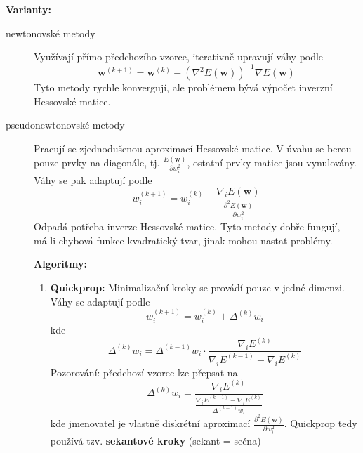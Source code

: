 \documentclass[11pt]{report} %
\renewcommand{\vec}[1]{\mathbf{#1}}
\numberwithin{equation}{section}
\begin{document}
\textbf{Varianty:}
\begin{description}
	
	
	\item[newtonovské metody] Využívají přímo předchozího vzorce, iterativně upravují váhy podle
	$$
	\vec{w}^{(k+1)} = \vec{w}^{(k)} - (\nabla^2 E(\vec{w}))^{-1} \nabla E(\vec{w})
	$$
	Tyto metody rychle konvergují, ale problémem bývá výpočet inverzní Hessovské matice.
	
	\item[pseudonewtonovské metody] Pracují se zjednodušenou aproximací Hessovské matice. V úvahu se berou pouze prvky na diagonále, tj. $\frac{E(\vec{w})}{\partial w_i^2}$, ostatní prvky matice jsou vynulovány. Váhy se pak adaptují podle
	$$
	w_i^{(k+1)} = w_i^{(k)} - \frac{\nabla_i E(\vec{w})}{\frac{\partial^2 E(\vec{w})}{\partial w_i^2}} 
	$$
	Odpadá potřeba inverze Hessovské matice. Tyto metody dobře fungují, má-li chybová funkce kvadratický tvar, jinak mohou nastat problémy.
	
	\noindent\textbf{Algoritmy:}
	\begin{enumerate}
		
		
		\item \textbf{Quickprop:} Minimalizační kroky se provádí pouze v jedné dimenzi.
		Váhy se adaptují podle
		$$
		w_i^{(k+1)} = w_i^{(k)} + \Delta^{(k)} w_i
		$$	
		kde
		$$\Delta^{(k)} w_i = \Delta^{(k-1)} w_i \cdot \frac{\nabla_i E^{(k)}}{\nabla_i E^{(k-1)} - \nabla_i E^{(k)}}$$
		Pozorování: předchozí vzorec lze přepsat na 
		$$\Delta^{(k)} w_i = \frac{\nabla_i E^{(k)}}{\frac{\nabla_i E^{(k-1)} - \nabla_i E^{(k)}}{\Delta^{(k-1)} w_i}}$$
		kde jmenovatel je vlastně diskrétní aproximací $\frac{\partial^2 E(\vec{w})}{\partial w_i^2}$. Quickprop tedy používá tzv. \textbf{sekantové kroky} (sekant = sečna)
	\end{enumerate}
\end{description}
\end{document}
